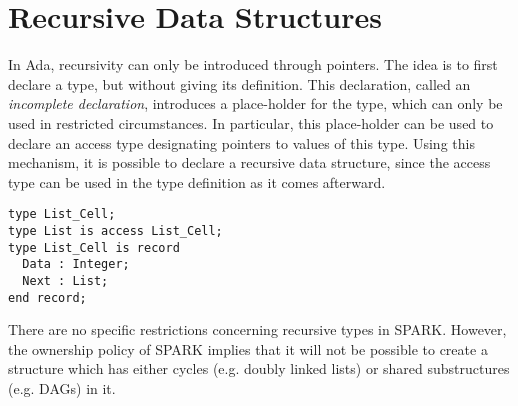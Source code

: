 \documentclass[runningheads]{llncs}
\begin{document}
\section{Recursive Data Structures}
In Ada, recursivity can only be introduced through pointers. The idea is to first declare a type, but without giving its definition. This declaration, called an \emph{incomplete declaration}, introduces a place-holder for the type, which can only be used in restricted circumstances. In particular, this place-holder can be used to declare an access type designating pointers to values of this type. %
Using this mechanism, it is possible to declare a recursive data structure, since the access type can be used in the type definition as it comes afterward.
\begin{lstlisting}
type List_Cell;
type List is access List_Cell;
type List_Cell is record
  Data : Integer;
  Next : List;
end record;
\end{lstlisting}
There are no specific restrictions concerning recursive types in SPARK. However, the ownership policy of SPARK implies that it will not be possible to create a structure which has either cycles (e.g. doubly linked lists) or shared substructures (e.g. DAGs) in it.
\end{document}
